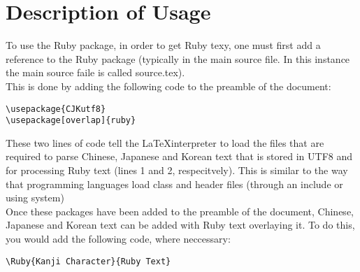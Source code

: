 \section{Description of Usage}
To use the Ruby package, in order to get Ruby texy, one must first add a reference to the Ruby package (typically in the main source file. In this instance the main source faile is called source.tex).\\
\indent{}This is done by adding the following code to the preamble of the document:
\lstset{numbers=left, stepnumber=1, frame=single}
	\begin{lstlisting}
\usepackage{CJKutf8}
\usepackage[overlap]{ruby}
	\end{lstlisting}
\indent{}These two lines of code tell the \LaTeX interpreter to load the files that are required to parse Chinese, Japanese and Korean text that is stored in UTF8 and for processing Ruby text (lines 1 and 2, respecitvely). This is similar to the way that programming languages load class and header files (through an include or using system)\\
\indent{}Once these packages have been added to the preamble of the document, Chinese, Japanese and Korean text can be added with Ruby text overlaying it. To do this, you would add the following code, where neccessary:
\lstset{numbers=left, stepnumber=1, frame=single}
	\begin{lstlisting}
\Ruby{Kanji Character}{Ruby Text}
	\end{lstlisting}